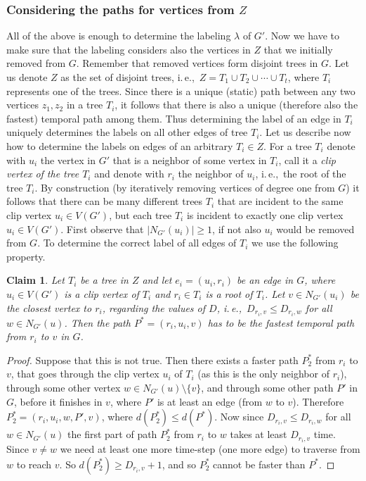 \documentclass[11pt,a4paper]{article}
\newtheorem{claim}[theorem]{Claim}
\theoremstyle{remark}
\theoremstyle{definition}
\newcommand{\ie}{i.\,e.,\ }
\begin{document}
\subsubsection*{\boldmath Considering the paths for vertices from $Z$}
All of the above is enough to determine the labeling $\lambda$ of $G'$. Now we have to make sure that the labeling considers also the vertices in $Z$ that we initially removed from $G$.
Remember that removed vertices form disjoint trees in $G$.
Let us denote $Z$ as the set of disjoint trees, \ie $Z = T_1 \cup T_2 \cup \cdots \cup T_t$, where $T_i$ represents one of the trees.
Since there is a unique (static) path between any two vertices $z_1, z_2$ in a tree $T_i$,
it follows that there is also a unique (therefore also the fastest) temporal path among them.
Thus determining the label of an edge in $T_i$ uniquely determines the labels on all other edges of tree $T_i$.
Let us describe now how to determine the labels on edges of an arbitrary $T_i \in Z$.
For a tree $T_i$ denote with $u_i$ the vertex in $G'$ that is a neighbor of some vertex in $T_i$, 
call it a \emph{clip vertex of the tree $T_i$}
and denote with $r_i$ the neighbor of $u_i$, \ie the root of the tree $T_i$.
By construction (by iteratively removing vertices of degree one from $G$) it follows that there can be many different trees $T_i$ that are incident to the same clip vertex $u_i \in V(G')$,
but each tree $T_i$ is incident to exactly one clip vertex $u_i \in V(G')$.
First observe that $|N_{G'}(u_i)|\geq 1$, if not also $u_i$ would be removed from $G$.
To determine the correct label of all edges of $T_i$ we use the following property.
\begin{claim}
Let $T_i$ be a tree in $Z$ and let $e_i = (u_i,r_i)$ be an edge in $G$, where $u_i \in V(G')$ is a clip vertex of $T_i$ and $r_i \in T_i$ is a root of $T_i$.
Let $v \in N_{G'}(u_i)$ be the closest vertex to $r_i$, regarding the values of $D$, \ie  $D_{r_i,v} \leq D_{r_i,w}$ for all $w \in N_{G'}(u)$.
Then the path $P^*=(r_i,u_i,v)$ has to be the fastest temporal path from $r_i$ to $v$ in $G$.
\end{claim}
\begin{proof}
Suppose that this is not true.
Then there exists a faster path $P^*_2$ from $r_i$ to $v$, that goes through the clip vertex $u_i$ of $T_i$ (as this is the only neighbor of $r_i$), through some other vertex $w \in N_{G'}(u) \setminus \{v \}$, 
and through some other path $P'$ in $G$, before it finishes in $v$, where $P'$ is at least an edge (from $w$ to $v$). 
Therefore $P^*_2= (r_i,u_i,w,P',v)$, where $d(P^*_2) \leq d(P^*)$.
Now since $D_{r_i,v} \leq D_{r_i,w}$ for all $ w\in N_{G'}(u)$ the first part of path $P^*_2$ from $r_i$ to $w$ takes at least $D_{r_i,v}$ time.
Since $v \neq w$ we need at least one more time-step (one more edge) to traverse from $w$ to reach $v$. 
So $d(P^*_2) \geq D_{r_i,v} + 1$, and so $P^*_2$ cannot be faster than $P^*$.
\end{proof}
\end{document}
